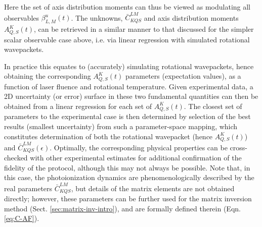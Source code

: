 \documentclass[10pt]{article}
\begin{document}

Here the set of axis distribution moments can thus be viewed as modulating all observables $\beta_{L,M}^{u}(t)$. The unknowns, $\bar{C}_{KQS}^{LM}$ and axis distribution moments $A_{Q,S}^{K}(t)$, can be retrieved in a similar manner to that discussed for the simpler scalar observable case above, i.e. via linear regression with simulated rotational wavepackets. 

In practice this equates to (accurately) simulating rotational wavepackets, hence obtaining the corresponding $A_{Q,S}^{K}(t)$ parameters (expectation values), as a function of laser fluence and rotational temperature. Given experimental data, a 2D uncertainty (or error) surface in these two fundamental quantities can then be obtained from a linear regression for each set of $A_{Q,S}^{K}(t)$. The closest set of parameters to the experimental case is then determined by selection of the best results (smallest uncertainty) from such a parameter-space mapping, which constitutes determination of both the rotational wavepacket (hence $A_{Q,S}^{K}(t)$) and $\bar{C}_{KQS}^{LM}(\epsilon)$. Optimally, the corresponding physical properties can be cross-checked with other experimental estimates for additional confirmation of the fidelity of the protocol, although this may not always be possible. Note that, in this case, the photoionization dynamics are phenomenologically described by the real parameters $\bar{C}_{KQS}^{LM}$, but details of the matrix elements are not obtained directly; however, these parameters can be further used for the matrix inversion method (Sect. \ref{sec:matrix-inv-intro}), and are formally defined therein (Eqn. \ref{eq:C-AF}).

\end{document}
